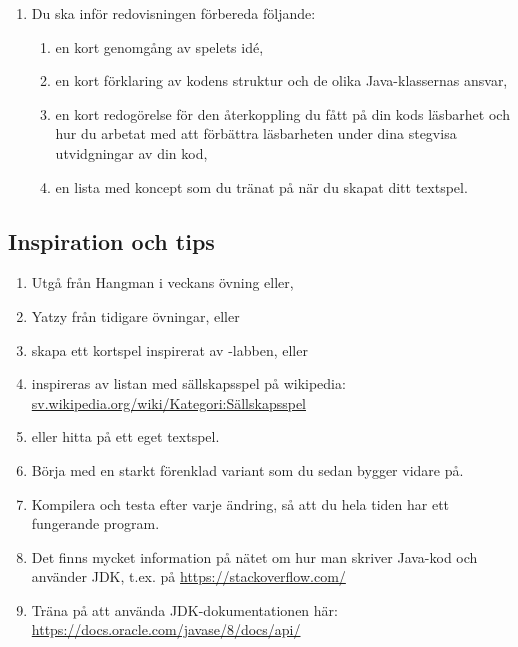 \begin{enumerate}
  \item Du ska inför redovisningen förbereda följande:
  \begin{enumerate}
    \item en kort genomgång av spelets idé,
    \item en kort förklaring av kodens struktur och de olika Java-klassernas ansvar,
    \item en kort redogörelse för den återkoppling du fått på din kods läsbarhet och hur du arbetat med att förbättra läsbarheten under dina stegvisa utvidgningar av din kod,
    \item en lista med koncept som du tränat på när du skapat ditt textspel.
  \end{enumerate}
\end{enumerate}

\subsection{Inspiration och tips}

\begin{enumerate}
  \item Utgå från Hangman i veckans övning eller,
  \item Yatzy från tidigare övningar, eller
  \item skapa ett kortspel inspirerat av -labben, eller
  \item inspireras av listan med sällskapsspel på wikipedia:\\ \href{https://sv.wikipedia.org/wiki/Kategori:Sällskapsspel}{sv.wikipedia.org/wiki/Kategori:Sällskapsspel}
  \item eller hitta på ett eget textspel.
  \item Börja med en starkt förenklad variant som du sedan bygger vidare på.
  \item Kompilera och testa efter varje ändring, så att du hela tiden har ett fungerande program.
  \item Det finns mycket information på nätet om hur man skriver Java-kod och använder JDK, t.ex. på \url{https://stackoverflow.com/}
  \item Träna på att använda JDK-dokumentationen här:\\ \url{https://docs.oracle.com/javase/8/docs/api/}
\end{enumerate}

